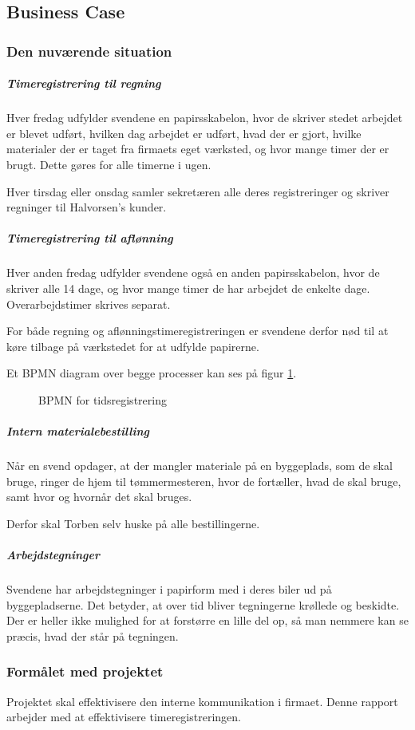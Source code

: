 \subsection{Business Case}
\subsubsection{Den nuværende situation}
\subparagraph{Timeregistrering til regning}

    Hver fredag udfylder svendene en papirsskabelon, hvor de skriver stedet arbejdet er blevet udført, hvilken dag arbejdet er udført, hvad der er gjort, hvilke materialer der er taget fra firmaets eget værksted, og hvor mange timer der er brugt.
    Dette gøres for alle timerne i ugen.
    
    Hver tirsdag eller onsdag samler sekretæren alle deres registreringer og skriver regninger til Halvorsen's kunder.

\subparagraph{Timeregistrering til aflønning}
    Hver anden fredag udfylder svendene også en anden papirsskabelon, hvor de skriver alle 14 dage, og hvor mange timer de har arbejdet de enkelte dage. Overarbejdstimer skrives separat.
    
    For både regning og aflønningstimeregistreringen er svendene derfor nød til at køre tilbage på værkstedet for at udfylde papirerne.

Et BPMN diagram over begge processer kan ses på figur \ref{fig:BPMN}.
    
\begin{figure}
    \caption{BPMN for tidsregistrering}
    \label{fig:BPMN}
\end{figure}
    
\subparagraph{Intern materialebestilling}
    Når en svend opdager, at der mangler materiale på en byggeplads, som de skal bruge, ringer de hjem til tømmermesteren, hvor de fortæller, hvad de skal bruge, samt hvor og hvornår det skal bruges.
    
    Derfor skal Torben selv huske på alle bestillingerne.
    
\subparagraph{Arbejdstegninger}
    Svendene har arbejdstegninger i papirform med i deres biler ud på byggepladserne.
    Det betyder, at over tid bliver tegningerne krøllede og beskidte.
    Der er heller ikke mulighed for at forstørre en lille del op, så man nemmere kan se præcis, hvad der står på tegningen.
    
\subsubsection{Formålet med projektet}
    Projektet skal effektivisere den interne kommunikation i     firmaet.
    Denne rapport arbejder med at effektivisere timeregistreringen.
    
